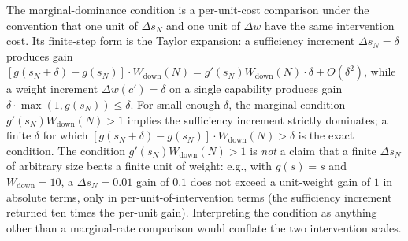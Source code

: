 \begin{remark}
\label{rem:dominance_scale}
The marginal-dominance condition is a per-unit-cost comparison
under the convention that one unit of $\Delta s_N$ and one unit
of $\Delta w$ have the same intervention cost.  Its finite-step
form is the Taylor expansion: a sufficiency increment
$\Delta s_N = \delta$ produces gain
$[g(s_N + \delta) - g(s_N)] \cdot W_{\mathrm{down}}(N) =
g'(s_N) W_{\mathrm{down}}(N) \cdot \delta + O(\delta^2)$, while
a weight increment $\Delta w(c') = \delta$ on a single
capability produces gain $\delta \cdot \max(1, g(s_N)) \leq
\delta$.  For small enough $\delta$, the marginal condition
$g'(s_N) W_{\mathrm{down}}(N) > 1$ implies the sufficiency
increment strictly dominates; a finite $\delta$ for which
$[g(s_N + \delta) - g(s_N)] \cdot W_{\mathrm{down}}(N) > \delta$
is the exact condition.  The condition
$g'(s_N) W_{\mathrm{down}}(N) > 1$ is \emph{not} a claim that a
finite $\Delta s_N$ of arbitrary size beats a finite unit of
weight: e.g., with $g(s) = s$ and $W_{\mathrm{down}} = 10$, a
$\Delta s_N = 0.01$ gain of $0.1$ does not exceed a
unit-weight gain of $1$ in absolute terms, only in
per-unit-of-intervention terms (the sufficiency increment
returned ten times the per-unit gain).  Interpreting the
condition as anything other than a marginal-rate comparison
would conflate the two intervention scales.
\end{remark}

